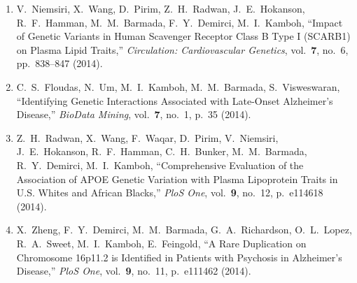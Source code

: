 \begin{enumerate}
\item V.\ Niemsiri, X.\ Wang, D.\ Pirim, Z.\ H.\ Radwan,
  J.\ E.\ Hokanson, R.\ F.\ Hamman, M.\ M.\ Barmada, F.\ Y.\ Demirci,
  M.\ I.\ Kamboh, ``Impact of Genetic Variants in Human Scavenger
  Receptor Class B Type I (SCARB1) on Plasma Lipid Traits,''
  \textit{Circulation: Cardiovascular Genetics}, vol.\ \textbf{7},
  no.\ 6, pp.\ 838--847 (2014).

\item C.\ S.\ Floudas, N.\ Um, M.\ I.\ Kamboh, M.\ M.\ Barmada,
  S.\ Visweswaran, ``Identifying Genetic Interactions Associated with
  Late-Onset Alzheimer's Disease,'' \textit{BioData Mining},
  vol.\ \textbf{7}, no.\ 1, p.\ 35 (2014).

\item Z.\ H.\ Radwan, X.\ Wang, F.\ Waqar, D.\ Pirim, V.\ Niemsiri,
  J.\ E.\ Hokanson, R.\ F.\ Hamman, C.\ H.\ Bunker, M.\ M.\ Barmada,
  R.\ Y.\ Demirci, M.\ I.\ Kamboh, ``Comprehensive Evaluation of the
  Association of APOE Genetic Variation with Plasma Lipoprotein Traits
  in U.S. Whites and African Blacks,'' \textit{PloS One},
  vol.\ \textbf{9}, no.\ 12, p.\ e114618 (2014).

\item X.\ Zheng, F.\ Y.\ Demirci, M.\ M.\ Barmada, G.\ A.\ Richardson,
  O.\ L.\ Lopez, R.\ A.\ Sweet, M.\ I.\ Kamboh, E.\ Feingold, ``A Rare
  Duplication on Chromosome 16p11.2 is Identified in Patients with
  Psychosis in Alzheimer's Disease,'' \textit{PloS One},
  vol.\ \textbf{9}, no.\ 11, p.\ e111462 (2014).


\end{enumerate}
